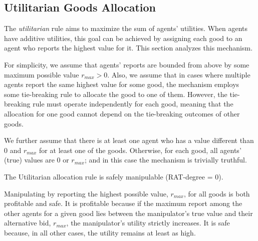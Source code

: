 \subsection{Utilitarian Goods Allocation}\label{sec:utilitarian-alloc}
The \emph{utilitarian} rule aims to maximize the sum of agents' utilities. 
When agents have additive utilities, this goal can be achieved by assigning each good to an agent who reports the highest value for it.
This section analyzes this mechanism.

For simplicity, we assume that agents’ reports are bounded from above by some maximum possible value $r_{max} >0$.
Also, we assume that in cases where multiple agents report the same highest value for some good, the mechanism employs some tie-breaking rule to allocate the good to one of them.
However, the tie-breaking rule must operate independently for each good, meaning that the allocation for one good cannot depend on the tie-breaking outcomes of other goods.


We further assume that there is at least one agent who has a value different than $0$ and $r_{max}$ for at least one of the goods.
Otherwise, for each good, all agents' (true) values are $0$ or $r_{max}$; and in this case the mechanism is trivially truthful.


\begin{theoremrep}
\label{prop:auction-knownagents}
The Utilitarian allocation rule is safely manipulable (RAT-degree = 0).
\end{theoremrep}

\begin{proofsketch}
    Manipulating by reporting the highest possible value, $r_{max}$, for all goods is both profitable and safe. It is profitable because if the maximum report among the other agents for a given good lies between the manipulator's true value and their alternative bid, $r_{max}$, the manipulator's utility strictly increases. It is safe because, in all other cases, the utility remains at least as high.
\end{proofsketch}

